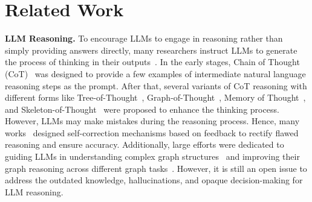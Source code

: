 \documentclass{article}
\begin{document}
\section{Related Work}
\vspace{-2mm}
\noindent \textbf{LLM Reasoning.}
To encourage LLMs to engage in reasoning rather than simply providing answers directly, many researchers instruct LLMs to generate the process of thinking in their outputs~\cite{wei2022chain, kojima2022large, zhou2022least}. 
In the early stages, Chain of Thought (CoT)~\cite{wei2022chain} was designed to provide a few examples of intermediate natural language reasoning steps as the prompt.
After that, several variants of CoT reasoning with different forms like Tree-of-Thought~\cite{yao2024tree}, Graph-of-Thought~\cite{besta2024graph}, Memory of Thought~\cite{li2023mot}, and Skeleton-of-Thought~\cite{ning2023skeleton} were proposed to enhance the thinking process.
However, LLMs may make mistakes during the reasoning process.
Hence, many works~\cite{shinn2023reflexion, kim2023prospector, madaan2023self, miao2023selfcheck} designed self-correction mechanisms based on feedback to rectify flawed reasoning and ensure accuracy.
Additionally, large efforts were dedicated to guiding LLMs in understanding complex graph structures~\cite{tang2023graphgpt, tan2024musegraph} and improving their graph reasoning across different graph tasks~\cite{chen2024collaboration, chen2022multi, chen2020mmea}.
However, it is still an open issue to address the outdated knowledge, hallucinations, and opaque decision-making for LLM reasoning.
\end{document}
